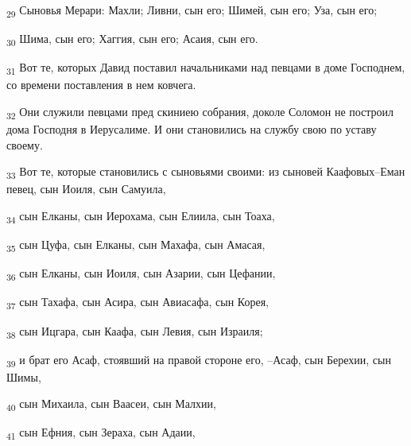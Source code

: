 \begin{tcolorbox}
\textsubscript{29} Сыновья Мерари: Махли; Ливни, сын его; Шимей, сын его; Уза, сын его;
\end{tcolorbox}
\begin{tcolorbox}
\textsubscript{30} Шима, сын его; Хаггия, сын его; Асаия, сын его.
\end{tcolorbox}
\begin{tcolorbox}
\textsubscript{31} Вот те, которых Давид поставил начальниками над певцами в доме Господнем, со времени поставления в нем ковчега.
\end{tcolorbox}
\begin{tcolorbox}
\textsubscript{32} Они служили певцами пред скиниею собрания, доколе Соломон не построил дома Господня в Иерусалиме. И они становились на службу свою по уставу своему.
\end{tcolorbox}
\begin{tcolorbox}
\textsubscript{33} Вот те, которые становились с сыновьями своими: из сыновей Каафовых--Еман певец, сын Иоиля, сын Самуила,
\end{tcolorbox}
\begin{tcolorbox}
\textsubscript{34} сын Елканы, сын Иерохама, сын Елиила, сын Тоаха,
\end{tcolorbox}
\begin{tcolorbox}
\textsubscript{35} сын Цуфа, сын Елканы, сын Махафа, сын Амасая,
\end{tcolorbox}
\begin{tcolorbox}
\textsubscript{36} сын Елканы, сын Иоиля, сын Азарии, сын Цефании,
\end{tcolorbox}
\begin{tcolorbox}
\textsubscript{37} сын Тахафа, сын Асира, сын Авиасафа, сын Корея,
\end{tcolorbox}
\begin{tcolorbox}
\textsubscript{38} сын Ицгара, сын Каафа, сын Левия, сын Израиля;
\end{tcolorbox}
\begin{tcolorbox}
\textsubscript{39} и брат его Асаф, стоявший на правой стороне его, --Асаф, сын Берехии, сын Шимы,
\end{tcolorbox}
\begin{tcolorbox}
\textsubscript{40} сын Михаила, сын Ваасеи, сын Малхии,
\end{tcolorbox}
\begin{tcolorbox}
\textsubscript{41} сын Ефния, сын Зераха, сын Адаии,
\end{tcolorbox}
